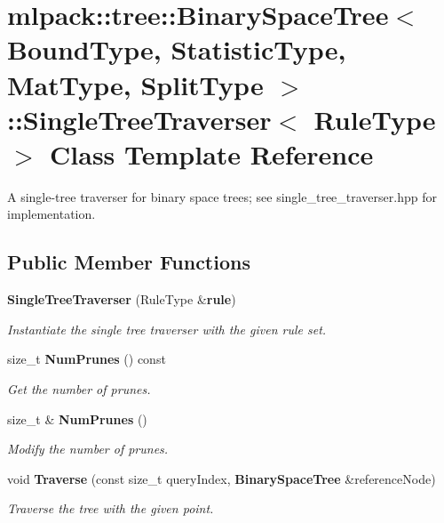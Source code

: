 \section{mlpack\-:\-:tree\-:\-:Binary\-Space\-Tree$<$ Bound\-Type, Statistic\-Type, Mat\-Type, Split\-Type $>$\-:\-:Single\-Tree\-Traverser$<$ Rule\-Type $>$ Class Template Reference}
\label{classmlpack_1_1tree_1_1BinarySpaceTree_1_1SingleTreeTraverser}


A single-\/tree traverser for binary space trees; see single\-\_\-tree\-\_\-traverser.\-hpp for implementation.  


\subsection*{Public Member Functions}
\begin{DoxyCompactItemize}
\item 
{\bf Single\-Tree\-Traverser} (Rule\-Type \&{\bf rule})
\begin{DoxyCompactList}\small\item\em Instantiate the single tree traverser with the given rule set. \end{DoxyCompactList}\item 
size\-\_\-t {\bf Num\-Prunes} () const 
\begin{DoxyCompactList}\small\item\em Get the number of prunes. \end{DoxyCompactList}\item 
size\-\_\-t \& {\bf Num\-Prunes} ()
\begin{DoxyCompactList}\small\item\em Modify the number of prunes. \end{DoxyCompactList}\item 
void {\bf Traverse} (const size\-\_\-t query\-Index, {\bf Binary\-Space\-Tree} \&reference\-Node)
\begin{DoxyCompactList}\small\item\em Traverse the tree with the given point. \end{DoxyCompactList}\end{DoxyCompactItemize}
